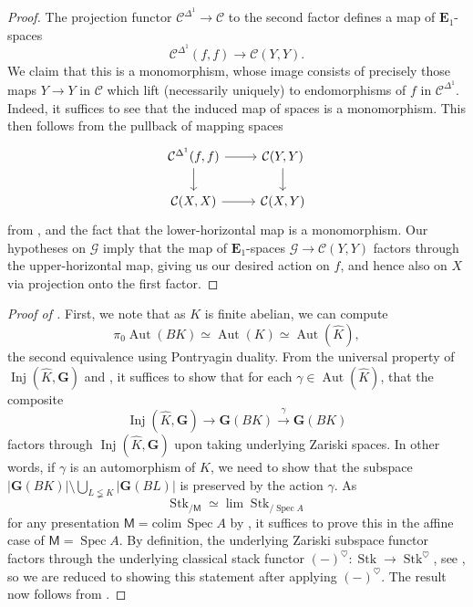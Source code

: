 \documentclass[11pt, a4paper]{article}
\DeclareMathOperator{\Spec}{Spec}
\newcommand{\1}{\mathbf{1}}
\DeclareMathOperator{\Inj}{Inj}
\DeclareMathOperator{\Stk}{Stk}
\DeclareMathOperator{\Aut}{Aut}
\newcommand{\colim}{\mathrm{colim}\,}
\newcommand{\dual}[1]{{\widehat{#1}}}
\newcommand{\calC}{\mathcal{C}}
\newcommand{\E}{\mathbf{E}}
\newcommand{\G}{\mathbf{G}}
\newcommand{\calG}{\mathcal{G}}
\newcommand{\M}{\mathsf{M}}
\newcommand{\ga}{\gamma}
\theoremstyle{plain}
\theoremstyle{definition}
\theoremstyle{remark}\numberwithin{equation}{section}
\begin{document}
\begin{proof}
    The projection functor $\calC^{\Delta^1} \to \calC$ to the second factor defines a map of $\E_1$-spaces
    \[\calC^{\Delta^1}(f,f) \to \calC(Y,Y).\]
    We claim that this is a monomorphism, whose image consists of precisely those maps $Y \to Y$ in $\calC$ which lift (necessarily uniquely) to endomorphisms of $f$ in $\calC^{\Delta^1}$. Indeed, it suffices to see that the induced map of spaces is a monomorphism. This then follows from the pullback of mapping spaces
    \[\begin{tikzcd}
        {\calC^{\Delta^1}(f,f)}\ar[r]\ar[d] &   {\calC(Y,Y)}\ar[d]  \\
        {\calC(X,X)}\ar[r]                  &   {\calC(X,Y)}
    \end{tikzcd}\]
    from \cite[Pr.B.1]{arakawa_arrow_cat_appendix}, and the fact that the lower-horizontal map is a monomorphism. Our hypotheses on $\calG$ imply that the map of $\E_1$-spaces $\calG \to \calC(Y,Y)$ factors through the upper-horizontal map, giving us our desired action on $f$, and hence also on $X$ via projection onto the first factor.
\end{proof}

\begin{proof}[Proof of ]
    First, we note that as $K$ is finite abelian, we can compute
    \[\pi_0 \Aut(BK) \simeq \Aut(K) \simeq \Aut(\dual{K}),\]
    the second equivalence using Pontryagin duality. From the universal property of $\Inj(\dual{K}, \G)$ and , it suffices to show that for each $\ga \in \Aut(\dual{K})$, that the composite
    \[\Inj(\dual{K}, \G) \to \G(BK) \xrightarrow{\ga} \G(BK)\]
    factors through $\Inj(\dual{K}, \G)$ upon taking underlying Zariski spaces. In other words, if $\ga$ is an automorphism of $K$, we need to show that the subspace $|\G(BK)| \setminus \bigcup_{L\lneqq K} |\G(BL)|$ is preserved by the action $\ga$. As
    \begin{equation}\label{eq:presentation_of_stack_category}
    \Stk_{/\M} \simeq \lim \Stk_{/\Spec A}
    \end{equation}
    for any presentation $\M = \colim \Spec A$ by \cite[Pr.2.1.2.9(4)]{reconstruction}, it suffices to prove this in the affine case of $\M=\Spec A$. By definition, the underlying Zariski subspace functor factors through the underlying classical stack functor $(-)^\heartsuit \colon \Stk \to \Stk^\heartsuit$, see \cite[Rmk.5.5.2]{temperedglobal}, so we are reduced to showing this statement after applying $(-)^\heartsuit$. The result now follows from .
\end{proof}
\end{document}
